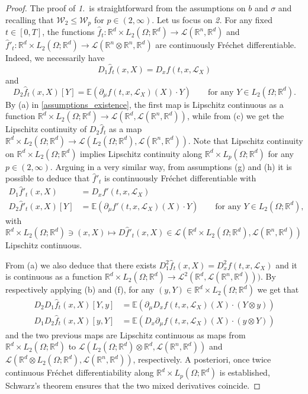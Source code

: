\documentclass[10pt, a4paper]{article} %
\newcommand{\R}{\mathbb{R}}
\newcommand{\E}{\mathbb{E}}
\theoremstyle{definition}
\theoremstyle{plain}
\begin{document}
\begin{proof}
    The proof of \textit{1.}\ is straightforward from the assumptions on $b$ and $\sigma$ and recalling that $\mathcal{W}_2 \le \mathcal{W}_p$ for $p \in (2,\infty)$. 
    Let us focus on \textit{2.} 
    For any fixed $t \in [0,T]$, the functions $\hat{f}_t: \R^d \times L_2(\Omega;\R^d) \to \mathscr{L}(\R^n,\R^d)$ and $\hat{f}'_t: \R^d \times L_2(\Omega;\R^d) \to \mathscr{L}(\R^n \otimes \R^n,\R^d)$ are continuously Fréchet differentiable. 
    Indeed, we necessarily have \begin{equation*}
        D_1 \hat{f}_t (x,X) = D_x f(t, x,\mathcal{L}_X)
    \end{equation*}
    and \begin{equation*}
        D_2 \hat{f}_t (x,X) [Y] = \E (\partial_\mu f(t, x,\mathcal{L}_X)(X) \cdot Y) \qquad \text{for any $Y \in L_2(\Omega;\R^d)$}.  
    \end{equation*}
    By (a) in \cref{assumptions_existence}, the first map is Lipschitz continuous as a function $\R^d \times L_2(\Omega;\R^d) \to \mathscr{L}(\R^d,\mathscr{L}(\R^n,\R^d))$, while from (c) we get the Lipschitz continuity of $D_2 \hat{f}_t$ as a map $\R^d \times L_2(\Omega;\R^d) \to \mathscr{L}(L_2(\Omega;\R^d),\mathscr{L}(\R^n,\R^d))$.
    Note that Lipschitz continuity on $\R^d \times L_2(\Omega;\R^d)$ implies Lipschitz continuity along $\R^d \times L_p(\Omega;\R^d)$ for any $p \in (2,\infty)$. 
    Arguing in a very similar way, from assumptions (g) and (h) it is possible to deduce that $\hat{f}'_t$ is continuously Fréchet differentiable with \begin{align*}
        D_1 \hat{f}'_t (x,X) &= D_x f'(t, x,\mathcal{L}_X) \\
        D_2 \hat{f}'_t (x,X) [Y] &= \E (\partial_\mu f'(t, x,\mathcal{L}_X)(X) \cdot Y) \qquad \text{for any $Y \in L_2(\Omega;\R^d)$},
    \end{align*}
    with $\R^d \times L_2(\Omega;\R^d) \ni (x,X) \mapsto D\hat{f}'_t(x,X) \in \mathscr{L}(\R^d \times L_2(\Omega;\R^d),\mathscr{L}(\R^n,\R^d))$ Lipschitz continuous. 

    From (a) we also deduce that there exists $D^2_1 \hat{f}_t (x,X) = D_x^2 f(t, x,\mathcal{L}_X)$ and it is continuous as a function $\R^d \times L_2(\Omega;\R^d) \to \mathscr{L}^2(\R^d , \mathscr{L}(\R^n,\R^d)))$. By respectively applying (b) and (f), for any $(y,Y) \in \R^d \times L_2(\Omega;\R^d)$ we get that \begin{align*}
        D_2 D_1 \hat{f}_t (x,X) [Y,y] &= \E(\partial_\mu D_x f (t, x,\mathcal{L}_X) (X) \cdot (Y \otimes y)) \\
        D_1 D_2 \hat{f}_t (x,X) [y,Y] &= \E(D_x \partial_\mu f (t, x,\mathcal{L}_X) (X) \cdot (y \otimes Y))
    \end{align*}
    and the two previous maps are Lipschitz continuous as maps from $\R^d \times L_2(\Omega;\R^d)$ to $\mathscr{L}(L_2(\Omega;\R^d) \otimes \R^d,\mathscr{L}(\R^n,\R^d))$ and $\mathscr{L}(\R^d \otimes L_2(\Omega;\R^d),\mathscr{L}(\R^n,\R^d))$, respectively. 
    A posteriori, once twice continuous Fréchet differentiability along $\R^d \times L_p(\Omega;\R^d)$ is established, Schwarz's theorem ensures that the two mixed derivatives coincide. 


\end{proof}
\end{document}
